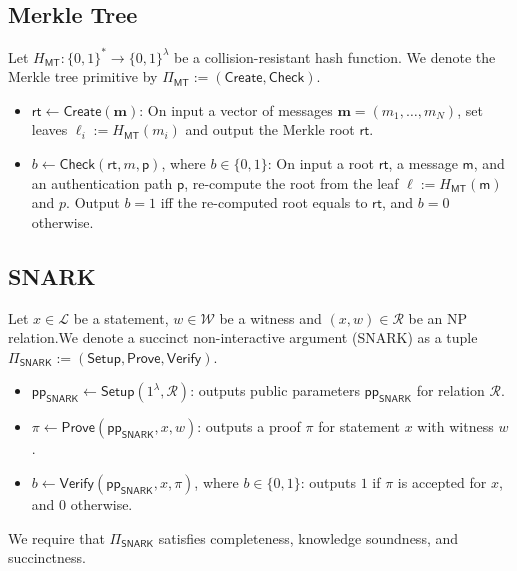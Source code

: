 \documentclass{article}
\newcommand{\ppSNARK}[0]{\mathsf{pp}_{\mathsf{SNARK}}}
\newcommand{\mkpth}[0]{\mathsf{p}}
\begin{document}
\subsection{Merkle Tree}

Let $H_{\mathsf{MT}}  : \{0,1\}^* \to \{0,1\}^\lambda$ be a collision-resistant hash function.
We denote the Merkle tree primitive by
$
  \Pi_{\mathsf{MT}} := (\mathsf{Create}, \mathsf{Check}).
$

\begin{itemize}

  \item $\mathsf{rt} \leftarrow \mathsf{Create}(\mathbf{m})$:
        On input a vector of messages
        $\mathbf{m} = (m_1,\dots,m_N)$, set leaves
        $\ell_i := H_{\mathsf{MT}}(m_i)$ and output the Merkle root
        $\mathsf{rt}$.

  \item $b \leftarrow \mathsf{Check}(\mathsf{rt}, m, \mkpth)$, where $b \in \{0,1\}$:
        On input a root $\mathsf{rt}$, a message $\mathsf{m}$, and an authentication path $\mkpth$, re-compute the root from the leaf
        $\ell := H_{\mathsf{MT}}(\mathsf{m})$ and $p$. Output $b = 1$ iff the
        re-computed root equals to $\mathsf{rt}$, and $b = 0$ otherwise.

\end{itemize}

\subsection{SNARK}

Let $x\in\mathcal{L}$ be a statement, $w\in\mathcal{W}$ be a witness and $(x,w) \in \mathcal{R}$ be an NP relation.We denote a succinct non-interactive argument (SNARK) as a tuple $\Pi_{\mathsf{SNARK}} := (\mathsf{Setup}, \mathsf{Prove}, \mathsf{Verify}).$
\begin{itemize}
  \item $\ppSNARK \leftarrow \mathsf{Setup}(1^\lambda,\mathcal{R})$: outputs public parameters $\ppSNARK$ for relation $\mathcal{R}$.
  \item $\pi \leftarrow \mathsf{Prove}(\ppSNARK, x, w)$: outputs a proof $\pi$ for statement $x$ with witness $w$.
  \item $b \leftarrow \mathsf{Verify}(\ppSNARK, x, \pi)$, where $b\in\{0,1\}$: outputs $1$ if $\pi$ is accepted for $x$, and $0$ otherwise.
\end{itemize}
We require that $\Pi_{\mathsf{SNARK}}$ satisfies completeness, knowledge soundness, and succinctness.
\end{document}
